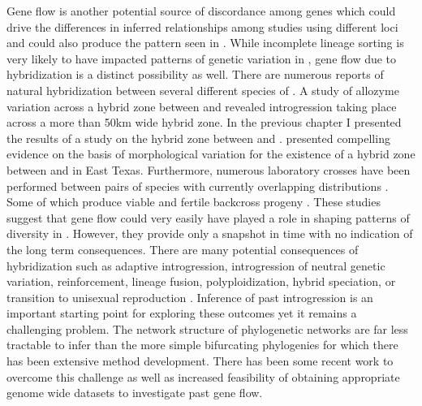 Gene flow is another potential source of discordance among genes which could  
drive the differences in inferred relationships among studies using different 
loci and could also produce the pattern seen in \fowl \parencite{degnan2009}. 
While incomplete lineage sorting is very likely to have impacted patterns of genetic  
variation in \anaxyrus, gene flow due to hybridization is a distinct possibility as well.
There are numerous reports of natural hybridization between several different 
species of \anaxyrus \parencite{green1996}. 
A study of allozyme variation across a hybrid zone between \amer and 
\hemiophrys revealed introgression taking place across a more than 50km wide hybrid zone.
In the previous chapter I presented the results of a study on the hybrid zone
between \amer and \terr.
\cite{meacham1962} presented compelling evidence on the basis of morphological 
variation for the existence of a hybrid zone between \fowl and \wood in East Texas.
Furthermore, numerous laboratory crosses have been performed between pairs of \anaxyrus 
species with currently overlapping distributions \parencite{blair1972,blair1963}.
Some of which produce viable and fertile backcross progeny \parencite{blair1972,blair1963}.
These studies suggest that gene flow could very easily have played a role in shaping patterns
of diversity in \anaxyrus. 
However, they provide only a snapshot in time with no indication of the long term 
consequences.
There are many potential consequences of hybridization such as adaptive introgression, 
introgression of neutral genetic variation, reinforcement, lineage fusion, 
polyploidization, hybrid speciation, or transition to unisexual reproduction \parencite{abbott2013}. 
Inference of past introgression is an important starting point for exploring these
outcomes yet it remains a challenging problem. 
The network structure of phylogenetic networks are far less tractable to infer than the 
more simple bifurcating phylogenies for which there has been extensive method development.
There has been some recent work to overcome this challenge as well as increased 
feasibility of obtaining appropriate genome wide datasets to investigate past 
gene flow.


